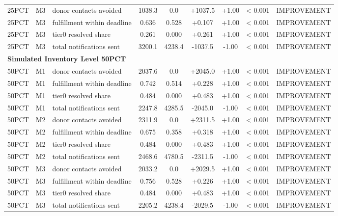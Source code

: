 \begin{table}[t]
\begin{tabular}{lllcccccl}
25PCT & M3 & donor contacts avoided & 1038.3 & 0.0 & +1037.5 & +1.00 & < 0.001 & IMPROVEMENT \\
25PCT & M3 & fulfillment within deadline & 0.636 & 0.528 & +0.107 & +1.00 & < 0.001 & IMPROVEMENT \\
25PCT & M3 & tier0 resolved share & 0.261 & 0.000 & +0.261 & +1.00 & < 0.001 & IMPROVEMENT \\
25PCT & M3 & total notifications sent & 3200.1 & 4238.4 & -1037.5 & -1.00 & < 0.001 & IMPROVEMENT \\
\midrule
\multicolumn{9}{l}{\textbf{Simulated Inventory Level 50PCT}} \\
\midrule
50PCT & M1 & donor contacts avoided & 2037.6 & 0.0 & +2045.0 & +1.00 & < 0.001 & IMPROVEMENT \\
50PCT & M1 & fulfillment within deadline & 0.742 & 0.514 & +0.228 & +1.00 & < 0.001 & IMPROVEMENT \\
50PCT & M1 & tier0 resolved share & 0.484 & 0.000 & +0.483 & +1.00 & < 0.001 & IMPROVEMENT \\
50PCT & M1 & total notifications sent & 2247.8 & 4285.5 & -2045.0 & -1.00 & < 0.001 & IMPROVEMENT \\
50PCT & M2 & donor contacts avoided & 2311.9 & 0.0 & +2311.5 & +1.00 & < 0.001 & IMPROVEMENT \\
50PCT & M2 & fulfillment within deadline & 0.675 & 0.358 & +0.318 & +1.00 & < 0.001 & IMPROVEMENT \\
50PCT & M2 & tier0 resolved share & 0.484 & 0.000 & +0.483 & +1.00 & < 0.001 & IMPROVEMENT \\
50PCT & M2 & total notifications sent & 2468.6 & 4780.5 & -2311.5 & -1.00 & < 0.001 & IMPROVEMENT \\
50PCT & M3 & donor contacts avoided & 2033.2 & 0.0 & +2029.5 & +1.00 & < 0.001 & IMPROVEMENT \\
50PCT & M3 & fulfillment within deadline & 0.756 & 0.528 & +0.226 & +1.00 & < 0.001 & IMPROVEMENT \\
50PCT & M3 & tier0 resolved share & 0.484 & 0.000 & +0.483 & +1.00 & < 0.001 & IMPROVEMENT \\
50PCT & M3 & total notifications sent & 2205.2 & 4238.4 & -2029.5 & -1.00 & < 0.001 & IMPROVEMENT \\
\bottomrule
\end{tabular}
\end{table}
